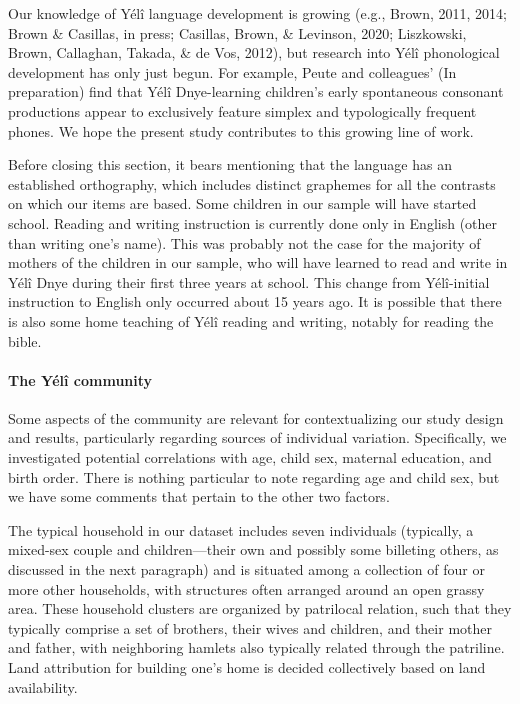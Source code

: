 \documentclass[
  english,
  ,man,floatsintext]{apa6}
\let\oldparagraph\paragraph
\renewcommand{\paragraph}[1]{\oldparagraph{#1}\mbox{}}
\begin{document}
Our knowledge of Yélî language development is growing (e.g., Brown, 2011, 2014; Brown \& Casillas, in press; Casillas, Brown, \& Levinson, 2020; Liszkowski, Brown, Callaghan, Takada, \& de Vos, 2012), but research into Yélî phonological development has only just begun. For example, Peute and colleagues' (In preparation) find that Yélî Dnye-learning children's early spontaneous consonant productions appear to exclusively feature simplex and typologically frequent phones. We hope the present study contributes to this growing line of work.

Before closing this section, it bears mentioning that the language has an established orthography, which includes distinct graphemes for all the contrasts on which our items are based. Some children in our sample will have started school. Reading and writing instruction is currently done only in English (other than writing one's name). This was probably not the case for the majority of mothers of the children in our sample, who will have learned to read and write in Yélî Dnye during their first three years at school. This change from Yélî-initial instruction to English only occurred about 15 years ago. It is possible that there is also some home teaching of Yélî reading and writing, notably for reading the bible.

\hypertarget{the-yuxe9luxee-community}{%
\paragraph{The Yélî community}\label{the-yuxe9luxee-community}}

Some aspects of the community are relevant for contextualizing our study design and results, particularly regarding sources of individual variation. Specifically, we investigated potential correlations with age, child sex, maternal education, and birth order. There is nothing particular to note regarding age and child sex, but we have some comments that pertain to the other two factors.

The typical household in our dataset includes seven individuals (typically, a mixed-sex couple and children---their own and possibly some billeting others, as discussed in the next paragraph) and is situated among a collection of four or more other households, with structures often arranged around an open grassy area. These household clusters are organized by patrilocal relation, such that they typically comprise a set of brothers, their wives and children, and their mother and father, with neighboring hamlets also typically related through the patriline. Land attribution for building one's home is decided collectively based on land availability.
\end{document}
